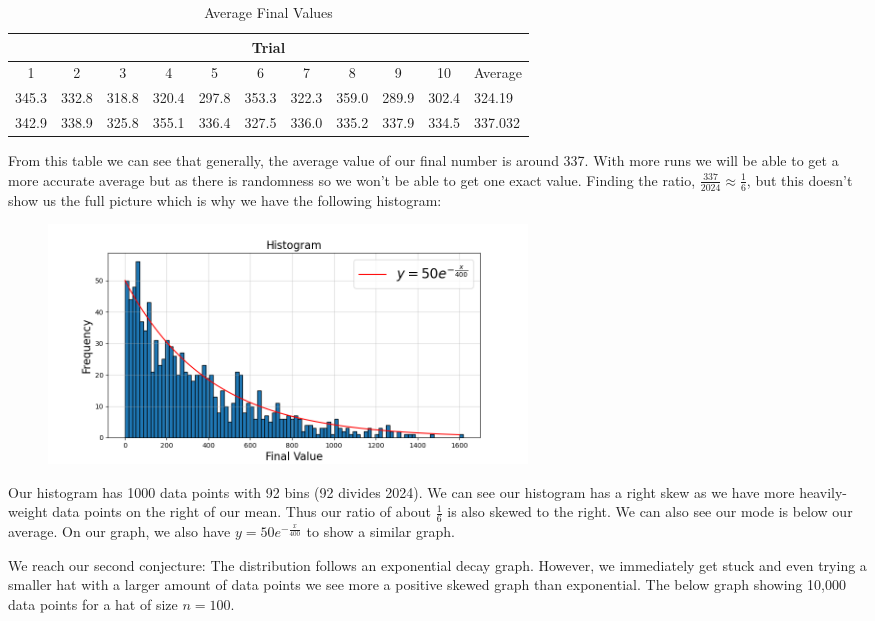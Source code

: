\documentclass[11pt]{article}
\newcommand{\keywordfont}{\textsc}
\newcommand{\keyword}[1]{%
  \marginpar{\raggedright\small\keywordfont{#1}}}
\begin{document}
\begin{table}[h]
    \centering
    \begin{tabular}{|c|c|c|c|c|c|c|c|c|c|l|} \hline 
  \multicolumn{11}{|c|}{Trial}\\ \hline 
          1&  2&  3&  4&  5&  6&  7&  8&  9& 10 &Average\\ \hline 
          345.3&  332.8&  318.8&  320.4&  297.8&  353.3&  322.3&  359.0&  289.9&  302.4&324.19\\ \hline 
          342.9&  338.9&  325.8&  355.1&  336.4&  327.5&  336.0&  335.2&  337.9&  334.5&337.032\\ \hline
    \end{tabular}
    \caption{Average Final Values}
    \label{tab:my_label}
\end{table}

From this table we can see that generally, the average value of our final number is around 337. With more runs we will be able to get a more accurate average but as there is randomness so we won't be able to get one exact value. Finding the ratio, $\frac{337}{2024} \approx \frac{1}{6}$, but this doesn't show us the full picture which is why we have the following histogram: 

\begin{figure}[h] 
   \centering
   \includegraphics[width=5in]{hist.png}
   \label{myfig}
\end{figure}

Our histogram has 1000 data points with 92 bins (92 divides 2024). We can see our histogram has a right skew as we have more heavily-weight data points on the right of our mean. Thus our ratio of about $\frac{1}{6}$ is also skewed to the right. We can also see our mode is below our average. On our graph, we also have $y = 50e^{-\frac{x}{400}}$ to show a similar graph.

We reach our second \keyword{Conjecture} conjecture: The distribution follows an exponential decay graph. However, we immediately \keyword{Stuck} get stuck and even trying a smaller hat with a larger amount of data points we see more a positive skewed graph than exponential. The below graph showing 10,000 data points for a hat of size $n = 100$. 
\end{document}
